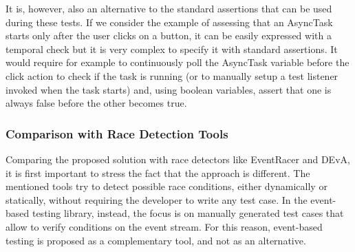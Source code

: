 \documentclass[11pt,a4paper,notitlepage]{article}
\begin{document}
It is, however, also an alternative to the standard assertions that can be used during these tests. If we consider the example of assessing that an AsyncTask starts only after the user clicks on a button, it can be easily expressed with a temporal check but it is very complex to specify it with standard assertions. It would require for example to continuously poll the AsyncTask variable before the click action to check if the task is running (or to manually setup a test listener invoked when the task starts) and, using boolean variables, assert that one is always false before the other becomes true.

\subsubsection{Comparison with Race Detection Tools}
Comparing the proposed solution with race detectors like EventRacer and DEvA, it is first important to stress the fact that the approach is different. The mentioned tools try to detect possible race conditions, either dynamically or statically, without requiring the developer to write any test case. In the event-based testing library, instead, the focus is on manually generated test cases that allow to verify conditions on the event stream. For this reason, event-based testing is proposed as a complementary tool, and not as an alternative.
\end{document}
